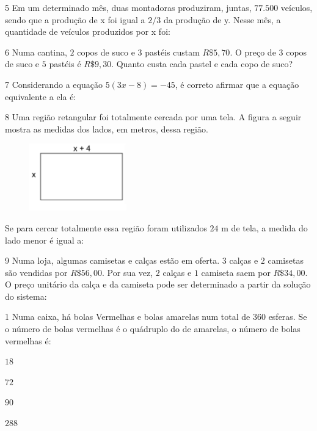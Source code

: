 \num{5}  Em um determinado mês, duas montadoras produziram, juntas, $77.500$
veículos, sendo que a produção de x foi igual a $2/3$ da produção de y. Nesse mês, a quantidade de veículos produzidos por x foi:


\num{6}  Numa cantina, $2$ copos de suco e $3$ pastéis custam $R\$5,70$. O preço de
3 copos de suco e $5$ pastéis é $R\$9,30$. Quanto custa cada pastel e cada
copo de suco?


\num{7}  Considerando a equação $5(3x - 8) = -45$, é correto afirmar que a equação equivalente a ela é:


\num{8}  Uma região retangular foi totalmente cercada por uma tela. A figura a
seguir mostra as medidas dos lados, em metros, dessa região.

\begin{figure}
\includegraphics[width=1.65625in,height=1.14583in]{./imgSAEB_6_MAT/media/image38.png}
\end{figure}

Se para cercar totalmente essa região foram utilizados $24$ m de tela, a
medida do lado menor é igual a:


\num{9} Numa loja, algumas camisetas e calças estão em oferta. $3$ calças e $2$
camisetas são vendidas por $R\$56,00$. Por sua vez, $2$ calças e $1$ camiseta
saem por $R\$34,00$. O preço unitário da calça e da camiseta pode ser
determinado a partir da solução do sistema:



\num{1}  Numa caixa, há bolas Vermelhas e bolas amarelas num total de $360$
esferas. Se o número de bolas vermelhas é o quádruplo do de amarelas, o
número de bolas vermelhas é:

\begin{escolha}
\item $18$
\item $72$
\item $90$
\item $288$
\end{escolha}

